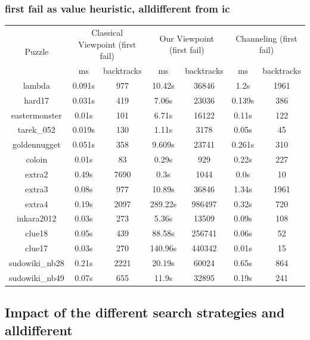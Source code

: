 \documentclass{report}
\begin{document}
\subsubsection{first fail as value heuristic, alldifferent from ic}
\begin{table}[h!]
  \begin{tabular}{|c|c|c|c|c|c|c|}
    \hline
    \multirow{2}{*}{Puzzle} &
      \multicolumn{2}{L|}{Classical Viewpoint (first fail)} &
      \multicolumn{2}{L|}{Our Viewpoint (first fail)} &
      \multicolumn{2}{L|}{ Channeling (first fail)} \\
    & ms & backtracks & ms & backtracks & ms & backtracks \\
    \hline
lambda & 0.091s & 977 & 10.42s & 36846 & 1.2s & 1961\\
hard17 & 0.031s & 419 & 7.06s & 23036 & 0.139s & 386\\
eastermonster & 0.01s & 101 & 6.71s & 16122 & 0.11s & 122\\
tarek\_052 & 0.019s & 130 & 1.11s & 3178 & 0.05s & 45\\
goldennugget & 0.051s & 358 & 9.609s & 23741 & 0.261s & 310\\
coloin & 0.01s & 83 & 0.29s & 929 & 0.22s & 227\\
extra2 & 0.49s & 7690 & 0.3s & 1044 & 0.0s & 10\\
extra3 & 0.08s & 977 & 10.89s & 36846 & 1.34s & 1961\\
extra4 & 0.19s & 2097 & 289.22s & 986497 & 0.32s & 720\\
inkara2012 & 0.03s & 273 & 5.36s & 13509 & 0.09s & 108\\
clue18 & 0.05s & 439 & 88.58s & 256741 & 0.06s & 52\\
clue17 & 0.03s & 270 & 140.96s & 440342 & 0.01s & 15\\
sudowiki\_nb28 & 0.21s & 2221 & 20.19s & 60024 & 0.65s & 864\\
sudowiki\_nb49 & 0.07s & 655 & 11.9s & 32895 & 0.19s & 241\\
 \hline
  \end{tabular}
\end{table}
\newpage
\subsection{Impact of the different search strategies and alldifferent}
\end{document}
